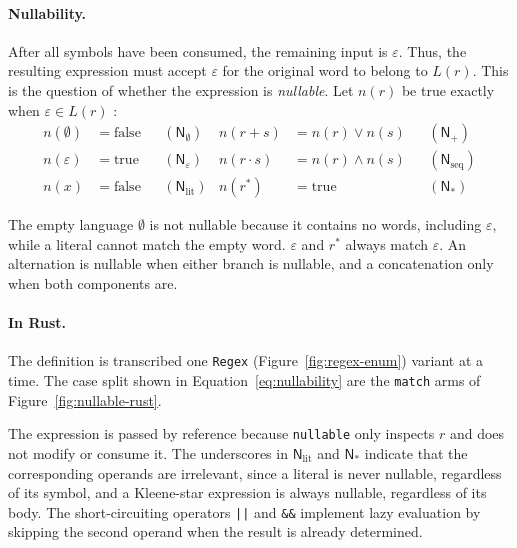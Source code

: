 %

\paragraph{Nullability.}
\label{par:nullability}
After all symbols have been consumed, the remaining input is $\varepsilon$. 
Thus, the resulting expression must accept $\varepsilon$ 
for the original word to belong to $L(r)$. 
This is the question of whether the expression is \emph{nullable}.
Let $n(r)$ be true exactly when $\varepsilon \in L(r)$ \citep[p.5]{sulzmann_slides}:
\begin{equation}\label{eq:nullability}
\begin{aligned}
n(\emptyset) &= \mathrm{false} &&(\mathsf{N}_{\emptyset}) &
n(r + s) &= n(r) \lor n(s) &&(\mathsf{N}_{+}) \\
n(\varepsilon) &= \mathrm{true} &&(\mathsf{N}_{\varepsilon}) &
n(r \cdot s) &= n(r) \land n(s) &&(\mathsf{N}_{\mathrm{seq}}) \\
n(x) &= \mathrm{false} &&(\mathsf{N}_{\mathrm{lit}}) &
n(r^{*}) &= \mathrm{true} &&(\mathsf{N}_{*})
\end{aligned}
\end{equation}

The empty language $\emptyset$ is not nullable 
because it contains no words, 
including $\varepsilon$, while a literal cannot match the empty word. 
$\varepsilon$ and $r^{*}$ always match $\varepsilon$.
An alternation is nullable when either branch is nullable, 
and a concatenation only when both components are.

%

\paragraph{In Rust.}
\label{par:nullability-rust}
The definition is transcribed one \texttt{Regex} 
(Figure~\ref{fig:regex-enum}) variant at a time. 
The case split shown in Equation~\eqref{eq:nullability} 
are the \texttt{match} arms of Figure~\ref{fig:nullable-rust}.

The expression is passed by reference 
because \texttt{nullable} only inspects $r$ and does not modify or consume it. 
The underscores in $\mathsf{N}_{\mathrm{lit}}$ and $\mathsf{N}_{*}$ 
indicate that the corresponding operands are irrelevant,
since a literal is never nullable, regardless of its symbol, 
and a Kleene-star expression is always nullable, regardless of its body. 
The short-circuiting operators \texttt{||} and \texttt{\&\&}
implement lazy evaluation by skipping the second operand 
when the result is already determined.


